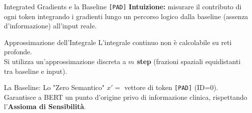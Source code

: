 \documentclass[aspectratio=169, 10pt]{beamer}
\begin{document}
\begin{frame}{Integrated Gradients e la Baseline \texttt{[PAD]}}
  \textbf{Intuizione:} misurare il contributo di ogni token
  integrando i gradienti lungo un percorso logico dalla
  \alert{baseline} (assenza d'informazione) all'input reale.

  \vspace{1.5em}
  \begin{block}{Approssimazione dell'Integrale}
    L'integrale continuo non è calcolabile su reti profonde.\\
    Si utilizza un'approssimazione discreta a \textbf{$m$ step} 
    (frazioni spaziali equidistanti tra baseline e input).
  \end{block}

  \vspace{1em}
  \begin{block}{La Baseline: Lo "Zero Semantico"}
    $x' = $ vettore di token \texttt{[PAD]} (ID=0).\\
    Garantisce a BERT un punto d'origine privo di informazione 
    clinica, rispettando l'\textbf{Assioma di Sensibilità}.
  \end{block}
\end{frame}
\end{document}
